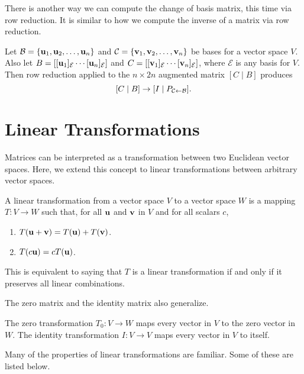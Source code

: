 \documentclass[../m73main.tex]{chapters}
\begin{document}
There is another way we can compute the change of basis matrix, this time via row reduction.
It is similar to how we compute the inverse of a matrix via row reduction.

\begin{theorem}
	Let $\mathcal{B} = \{\mathbf{u}_1, \mathbf{u}_2, \ldots, \mathbf{u}_n\}$ and $\mathcal{C} = \{\mathbf{v}_1, \mathbf{v}_2, \ldots, \mathbf{v}_n\}$ be bases for a vector space $V$.
	Also let $B = [[\mathbf{u}_1]_{\mathcal{E}} \cdots [\mathbf{u}_n]_{\mathcal{E}}]$ and $C = [[\mathbf{v}_1]_{\mathcal{E}} \cdots [\mathbf{v}_n]_{\mathcal{E}}]$, where $\mathcal{E}$ is any basis for $V$.
	Then row reduction applied to the $n \times 2n$ augmented matrix $[C \;|\; B]$ produces
	\[ [C \;|\; B] \to [I \;|\; P_{\mathcal{C} \leftarrow \mathcal{B}}]. \]
\end{theorem}

\section{Linear Transformations}
Matrices can be interpreted as a transformation between two Euclidean vector spaces.
Here, we extend this concept to linear transformations between arbitrary vector spaces.

\begin{definition}
	A linear transformation from a vector space $V$ to a vector space $W$ is a mapping $T : V \to W$ such that, for all $\mathbf{u}$ and $\mathbf{v}$ in $V$ and for all scalars $c$,
	\begin{enumerate}
		\item $T(\mathbf{u} + \mathbf{v}) = T(\mathbf{u}) + T(\mathbf{v})$.
		\item $T(c \mathbf{u}) = cT(\mathbf{u})$.
	\end{enumerate}
	This is equivalent to saying that $T$ is a linear transformation if and only if it preserves all linear combinations.
\end{definition}

The zero matrix and the identity matrix also generalize.

\begin{definition}
	The zero transformation $T_0 : V \to W$ maps every vector in $V$ to the zero vector in $W$.
	The identity transformation $I : V \to V$ maps every vector in $V$ to itself.
\end{definition}

Many of the properties of linear transformations are familiar.
Some of these are listed below.
\end{document}
